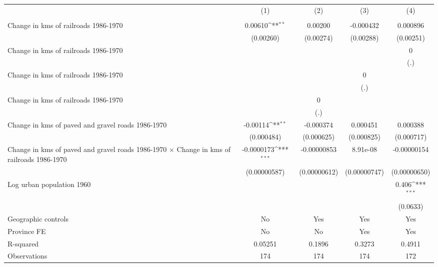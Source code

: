 {
\def\sym#1{\ifmmode^{#1}\else\(^{#1}\)\fi}
\begin{tabular}{l*{4}{c}}
\hline\hline
                &\multicolumn{1}{c}{(1)}&\multicolumn{1}{c}{(2)}&\multicolumn{1}{c}{(3)}&\multicolumn{1}{c}{(4)}\\
                &\multicolumn{1}{c}{}&\multicolumn{1}{c}{}&\multicolumn{1}{c}{}&\multicolumn{1}{c}{}\\
\hline
Change in kms of railroads 1986-1970&  0.00610\sym{**} &  0.00200         &-0.000432         & 0.000896         \\
                &(0.00260)         &(0.00274)         &(0.00288)         &(0.00251)         \\
[1em]
Change in kms of railroads 1986-1970&                  &                  &                  &        0         \\
                &                  &                  &                  &      (.)         \\
[1em]
Change in kms of railroads 1986-1970&                  &                  &        0         &                  \\
                &                  &                  &      (.)         &                  \\
[1em]
Change in kms of railroads 1986-1970&                  &        0         &                  &                  \\
                &                  &      (.)         &                  &                  \\
[1em]
Change in kms of paved and gravel roads 1986-1970& -0.00114\sym{**} &-0.000374         & 0.000451         & 0.000388         \\
                &(0.000484)         &(0.000625)         &(0.000825)         &(0.000717)         \\
[1em]
Change in kms of paved and gravel roads 1986-1970 $\times$ Change in kms of railroads 1986-1970&-0.0000173\sym{***}&-0.00000853         & 8.91e-08         &-0.00000154         \\
                &(0.00000587)         &(0.00000612)         &(0.00000747)         &(0.00000650)         \\
[1em]
Log urban population 1960&                  &                  &                  &    0.406\sym{***}\\
                &                  &                  &                  & (0.0633)         \\
\hline
Geographic controls&       No         &      Yes         &      Yes         &      Yes         \\
Province FE     &       No         &       No         &      Yes         &      Yes         \\
R-squared       &  0.05251         &   0.1896         &   0.3273         &   0.4911         \\
Observations    &      174         &      174         &      174         &      172         \\
\hline\hline
\end{tabular}
}
